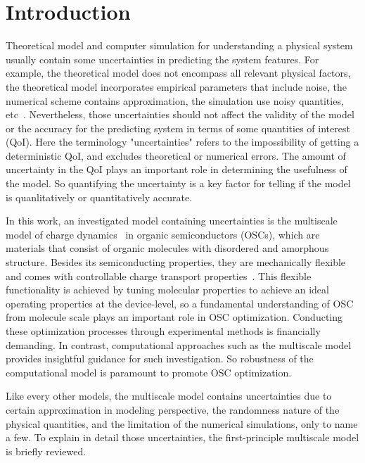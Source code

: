 \documentclass[%
 reprint,
superscriptaddress,
 amsmath,amssymb,
 aps,
prb,
floatfix
]{revtex4-2}
\begin{document}
\section{Introduction}

Theoretical model and computer simulation for understanding a physical system usually contain some uncertainties in predicting the system features. 
For example, the theoretical model does not encompass all relevant physical factors, the theoretical model incorporates empirical parameters that include noise, the numerical scheme contains approximation, the simulation use noisy quantities, etc~\cite{sarkar_uncertainty_2017,oconnor_quantifying_2024, chernatynskiy_uncertainty_2013, suleimenova_tutorial_2021,coveney_reliability_2021, coveney_when_2021}.
Nevertheless, those uncertainties should not affect the validity of the model or the accuracy for the predicting system in terms of some quantities of interest (QoI). 
Here the terminology "uncertainties" refers to the impossibility of getting a deterministic QoI, and excludes theoretical or numerical errors. 
The amount of uncertainty in the QoI plays an important role in determining the usefulness of the model. 
So quantifying the uncertainty is a key factor for telling if the model is quanlitatively or quantitatively accurate. 

In this work, an investigated model containing uncertainties is the multiscale model of charge dynamics~\cite{Baumeier2011, edeling_global_2024,coropceanu_charge_2007} in organic semiconductors (OSCs), which are materials that consist of organic molecules with disordered and amorphous structure. Besides its semiconducting properties, they are mechanically flexible and comes with controllable charge transport properties~\cite{hamers_flexible_2001,liu_high_2015,chow_organic_2020}. 
This flexible functionality is achieved by tuning molecular properties to achieve an ideal operating properties at the device-level\cite{bronstein_role_2020, bredas_organic_2002}, so a fundamental understanding of OSC from molecule scale  plays an important role in OSC optimization.
Conducting these optimization processes through experimental methods is financially demanding. In contrast, computational approaches such as the multiscale model provides insightful guidance for such investigation. So robustness of the computational model is paramount to promote OSC optimization.

Like every other models, the multiscale model contains uncertainties due to certain approximation in modeling perspective, the randomness nature of the physical quantities, and the limitation of the numerical simulations, only to name a few.
To explain in detail those uncertainties, the first-principle multiscale model is briefly reviewed. 
\end{document}
